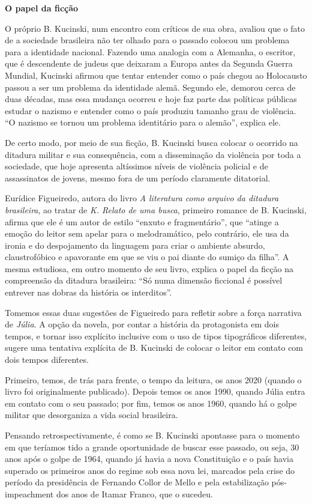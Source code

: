 \documentclass[12pt]{extarticle}
\begin{document}
\textbf{O papel da ficção}

O próprio B. Kucinski, num encontro com críticos de sua obra, avaliou
que o fato de a sociedade brasileira não ter olhado para o passado
colocou um problema para a identidade nacional. Fazendo uma analogia com
a Alemanha, o escritor, que é descendente de judeus que deixaram a
Europa antes da Segunda Guerra Mundial, Kucinski afirmou que tentar
entender como o país chegou ao Holocausto passou a ser um problema da
identidade alemã. Segundo ele, demorou cerca de duas décadas, mas essa
mudança ocorreu e hoje faz parte das políticas públicas estudar o
nazismo e entender como o país produziu tamanho grau de violência. ``O
nazismo se tornou um problema identitário para o alemão'', explica ele.

De certo modo, por meio de sua ficção, B. Kucinski busca colocar o
ocorrido na ditadura militar e sua consequência, com a disseminação da
violência por toda a sociedade, que hoje apresenta altíssimos níveis de
violência policial e de assassinatos de jovens, mesmo fora de um período
claramente ditatorial.

Eurídice Figueiredo, autora do livro \emph{A literatura como arquivo da
ditadura brasileira}, ao tratar de \emph{K. Relato de uma busca},
primeiro romance de B. Kucinski, afirma que ele é um autor de estilo
``enxuto e fragmentário'', que ``atinge a emoção do leitor sem apelar
para o melodramático, pelo contrário, ele usa da ironia e do
despojamento da linguagem para criar o ambiente absurdo, claustrofóbico
e apavorante em que se viu o pai diante do sumiço da filha''. A mesma
estudiosa, em outro momento de seu livro, explica o papel da ficção na
compreensão da ditadura brasileira: ``Só numa dimensão ficcional é
possível entrever nas dobras da história os interditos''.

Tomemos essas duas sugestões de Figueiredo para refletir sobre a força
narrativa de \emph{Júlia}. A opção da novela, por contar a história da
protagonista em dois tempos, e tornar isso explícito inclusive com o uso
de tipos tipográficos diferentes, sugere uma tentativa explícita de B.
Kucinski de colocar o leitor em contato com dois tempos diferentes.

Primeiro, temos, de trás para frente, o tempo da leitura, os anos 2020
(quando o livro foi originalmente publicado). Depois temos os anos 1990,
quando Júlia entra em contato com o seu passado; por fim, temos os anos
1960, quando há o golpe militar que desorganiza a vida social
brasileira.

Pensando retrospectivamente, é como se B. Kucinski apontasse para o
momento em que teríamos tido a grande oportunidade de buscar esse
passado, ou seja, 30 anos após o golpe de 1964, quando já havia a nova
Constituição e o país havia superado os primeiros anos do regime sob
essa nova lei, marcados pela crise do período da presidência de Fernando
Collor de Mello e pela estabilização pós-impeachment dos anos de Itamar
Franco, que o sucedeu.
\end{document}
